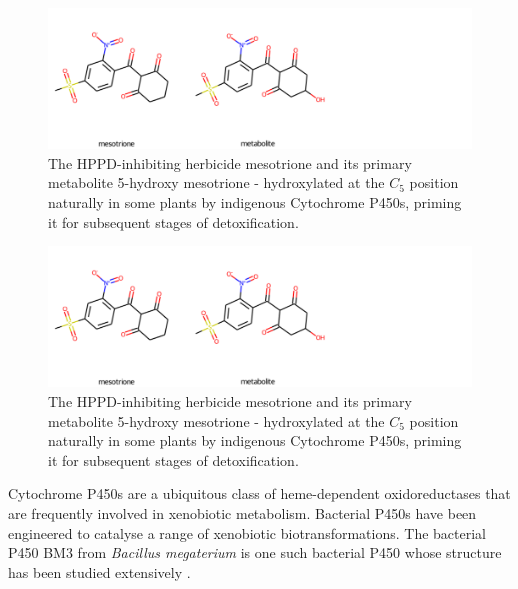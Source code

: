 \documentclass[16pt]{book}
\begin{document}
\begin{figure}
	\begin{center}
	\caption{\label{mesotrione} The HPPD-inhibiting herbicide mesotrione and its primary metabolite 5-hydroxy mesotrione - hydroxylated at the $C_5$ position naturally in some plants by indigenous Cytochrome P450s, priming it for subsequent stages of detoxification.}
	\includegraphics[width = \textwidth]{img/mesotrione+metabolite.png}
	\end{center}
\end{figure}

\par
\begin{figure}
         \begin{center}
         \caption{\label{mesotrione} The HPPD-inhibiting herbicide mesotrione and its primary metabolite 5-hydroxy mesotrione - hydroxylated at the $C_5$ position naturally in some plants by indigenous Cytochrome P450s, priming it for subsequent stages of detoxification.}
         \includegraphics[width = \textwidth]{img/mesotrione+metabolite.png}
         \end{center}
 \end{figure}

 \par

Cytochrome P450s are a ubiquitous class of heme-dependent oxidoreductases that are frequently involved in xenobiotic metabolism. %
Bacterial P450s have been engineered to catalyse a range of xenobiotic biotransformations. The bacterial P450 BM3 from \textit{Bacillus megaterium} is one such bacterial P450 whose structure has been studied extensively \cite{munro2002p450}. 
\end{document}
